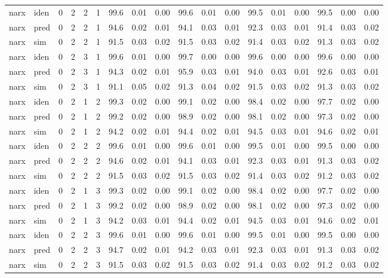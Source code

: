 \begin{landscape}
\begin{center}
\begin{longtable}{ll|cccc|ccc|ccc|ccc|ccc}
 \hline 
narx & iden & 0 & 2 & 2 & 1 & 99.6 & 0.01 & 0.00 & 99.6 & 0.01 & 0.00 & 99.5 & 0.01 & 0.00 & 99.5 & 0.00 & 0.00 \\ 
narx & pred & 0 & 2 & 2 & 1 & 94.6 & 0.02 & 0.01 & 94.1 & 0.03 & 0.01 & 92.3 & 0.03 & 0.01 & 91.4 & 0.03 & 0.02 \\ 
narx & sim  & 0 & 2 & 2 & 1 & 91.5 & 0.03 & 0.02 & 91.5 & 0.03 & 0.02 & 91.4 & 0.03 & 0.02 & 91.3 & 0.03 & 0.02 \\ 
 \hline 
narx & iden & 0 & 2 & 3 & 1 & 99.6 & 0.01 & 0.00 & 99.7 & 0.00 & 0.00 & 99.6 & 0.00 & 0.00 & 99.6 & 0.00 & 0.00 \\ 
narx & pred & 0 & 2 & 3 & 1 & 94.3 & 0.02 & 0.01 & 95.9 & 0.03 & 0.01 & 94.0 & 0.03 & 0.01 & 92.6 & 0.03 & 0.01 \\ 
narx & sim  & 0 & 2 & 3 & 1 & 91.1 & 0.05 & 0.02 & 91.3 & 0.04 & 0.02 & 91.5 & 0.03 & 0.02 & 91.3 & 0.03 & 0.02 \\ 
 \hline 
narx & iden & 0 & 2 & 1 & 2 & 99.3 & 0.02 & 0.00 & 99.1 & 0.02 & 0.00 & 98.4 & 0.02 & 0.00 & 97.7 & 0.02 & 0.00 \\ 
narx & pred & 0 & 2 & 1 & 2 & 99.2 & 0.02 & 0.00 & 98.9 & 0.02 & 0.00 & 98.1 & 0.02 & 0.00 & 97.3 & 0.02 & 0.00 \\ 
narx & sim  & 0 & 2 & 1 & 2 & 94.2 & 0.02 & 0.01 & 94.4 & 0.02 & 0.01 & 94.5 & 0.03 & 0.01 & 94.6 & 0.02 & 0.01 \\ 
 \hline 
narx & iden & 0 & 2 & 2 & 2 & 99.6 & 0.01 & 0.00 & 99.6 & 0.01 & 0.00 & 99.5 & 0.01 & 0.00 & 99.5 & 0.00 & 0.00 \\ 
narx & pred & 0 & 2 & 2 & 2 & 94.6 & 0.02 & 0.01 & 94.1 & 0.03 & 0.01 & 92.3 & 0.03 & 0.01 & 91.3 & 0.03 & 0.02 \\ 
narx & sim  & 0 & 2 & 2 & 2 & 91.5 & 0.03 & 0.02 & 91.5 & 0.03 & 0.02 & 91.4 & 0.03 & 0.02 & 91.2 & 0.03 & 0.02 \\ 
 \hline 
narx & iden & 0 & 2 & 1 & 3 & 99.3 & 0.02 & 0.00 & 99.1 & 0.02 & 0.00 & 98.4 & 0.02 & 0.00 & 97.7 & 0.02 & 0.00 \\ 
narx & pred & 0 & 2 & 1 & 3 & 99.2 & 0.02 & 0.00 & 98.9 & 0.02 & 0.00 & 98.1 & 0.02 & 0.00 & 97.3 & 0.02 & 0.00 \\ 
narx & sim  & 0 & 2 & 1 & 3 & 94.2 & 0.03 & 0.01 & 94.4 & 0.02 & 0.01 & 94.5 & 0.03 & 0.01 & 94.6 & 0.02 & 0.01 \\ 
 \hline 
narx & iden & 0 & 2 & 2 & 3 & 99.6 & 0.01 & 0.00 & 99.6 & 0.01 & 0.00 & 99.5 & 0.01 & 0.00 & 99.5 & 0.00 & 0.00 \\ 
narx & pred & 0 & 2 & 2 & 3 & 94.7 & 0.02 & 0.01 & 94.2 & 0.03 & 0.01 & 92.3 & 0.03 & 0.01 & 91.3 & 0.03 & 0.02 \\ 
narx & sim  & 0 & 2 & 2 & 3 & 91.5 & 0.03 & 0.02 & 91.5 & 0.03 & 0.02 & 91.4 & 0.03 & 0.02 & 91.2 & 0.03 & 0.02 \\ 
 \hline 
\end{longtable} 
\normalsize \end{center} 
 \end{landscape}